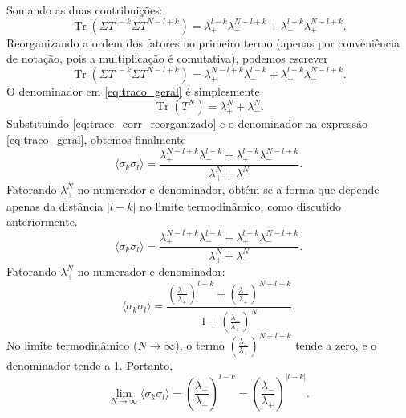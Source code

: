 \documentclass[11pt,a4paper]{article}
\begin{document}
%
Somando as duas contribuições:
%
\begin{equation}
\operatorname{Tr}\left( \Sigma T^{l-k} \Sigma T^{N-l+k} \right)
= \lambda_+^{l-k} \lambda_-^{N-l+k} + \lambda_-^{l-k} \lambda_+^{N-l+k}.
\label{eq:trace_corr_calculado}
\end{equation}
%
Reorganizando a ordem dos fatores no primeiro termo (apenas por conveniência de notação, pois a multiplicação é comutativa), podemos escrever
%
\begin{equation}
\operatorname{Tr}\left( \Sigma T^{l-k} \Sigma T^{N-l+k} \right)
= \lambda_+^{N-l+k} \lambda_-^{l-k} + \lambda_+^{l-k} \lambda_-^{N-l+k}.
\label{eq:trace_corr_reorganizado}
\end{equation}
%
O denominador em \eqref{eq:traco_geral} é simplesmente
%
\begin{equation}
\operatorname{Tr}\left( T^N \right) = \lambda_+^N + \lambda_-^N.
\end{equation}
%
Substituindo \eqref{eq:trace_corr_reorganizado} e o denominador na expressão \eqref{eq:traco_geral}, obtemos finalmente
%
\begin{equation}
\boxed{
\langle \sigma_k \sigma_l \rangle
= \frac{ \lambda_+^{N-l+k} \lambda_-^{l-k} + \lambda_+^{l-k} \lambda_-^{N-l+k} }{ \lambda_+^N + \lambda_-^N }.
}
\label{eq:corr_final_passos}
\end{equation}
%
Fatorando $\lambda_+^N$ no numerador e denominador, obtém-se a forma que depende apenas da distância $|l-k|$ no limite termodinâmico, como discutido anteriormente.
%
\begin{equation}
\langle \sigma_k \sigma_l \rangle
= \frac{ \lambda_+^{N-l+k} \lambda_-^{l-k} + \lambda_+^{l-k} \lambda_-^{N-l+k} }{ \lambda_+^N + \lambda_-^N }.
\end{equation}
%
Fatorando $\lambda_+^N$ no numerador e denominador:
%
\begin{equation}
\langle \sigma_k \sigma_l \rangle
= \frac{ \left( \frac{\lambda_-}{\lambda_+} \right)^{l-k} + \left( \frac{\lambda_-}{\lambda_+} \right)^{N-l+k} }
{ 1 + \left( \frac{\lambda_-}{\lambda_+} \right)^N }.
\end{equation}
%
No limite termodinâmico ($N \to \infty$), o termo $\left( \frac{\lambda_-}{\lambda_+} \right)^{N-l+k}$ tende a zero, e o denominador tende a 1. Portanto,
%
\begin{equation}
\boxed{
\lim_{N \to \infty} \langle \sigma_k \sigma_l \rangle
= \left( \frac{\lambda_-}{\lambda_+} \right)^{l-k}
= \left( \frac{\lambda_-}{\lambda_+} \right)^{|l-k|}
}.
\label{eq:correlacao_geral}
\end{equation}
\end{document}
